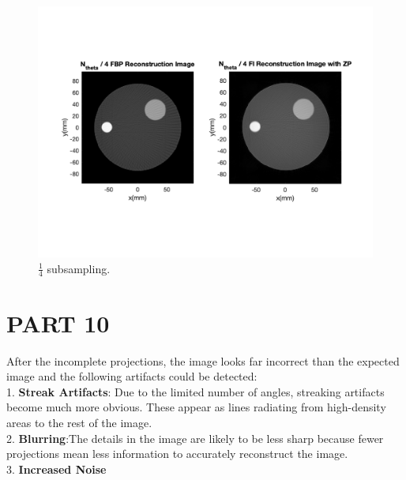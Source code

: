 \documentclass{report}
\begin{document}
\begin{figure}[hb]
    \centering
    \includegraphics[width=1\textwidth]{9.png}
    \caption{$\frac{1}{4}$ subsampling.}
\end{figure}
\newpage 
\section[short]{PART 10}
After the incomplete projections, the image looks far incorrect than the expected image
and the following artifacts could be detected:\\

1. \textbf{Streak Artifacts}: Due to the limited number of angles, streaking artifacts become
much more obvious. These appear as lines radiating from high-density areas to 
the rest of the image.\\

2. \textbf{Blurring}:The details in the image are likely to be less sharp 
because fewer projections mean less information to accurately reconstruct the image.\\

3. \textbf{Increased Noise}\\
\end{document}

